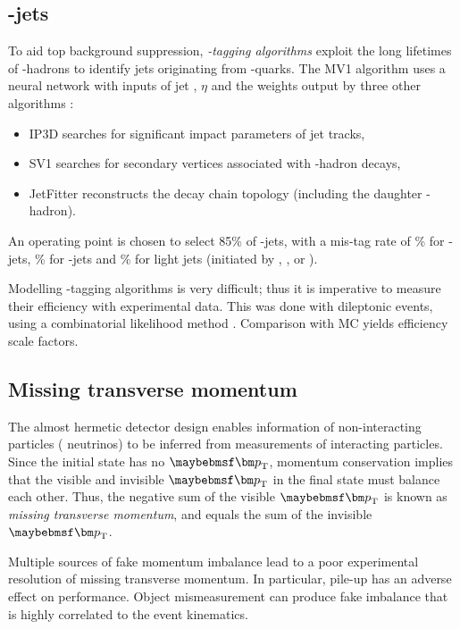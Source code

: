 \subsection{\Pbottom-jets}
\label{sec:objects:bjets}

To aid top background suppression, \textit{\Pbottom-tagging algorithms} exploit the long 
lifetimes of \Pbottom-hadrons to identify jets originating from \Pbottom-quarks. The MV1 
algorithm uses a neural network with inputs of jet \pt, $\eta$ and the weights output 
by three other algorithms \cite{Btag:algorithms}:
\begin{itemize}[noitemsep,nolistsep]
	\item IP3D searches for significant impact parameters of jet tracks,
	\item SV1 searches for secondary vertices associated with \Pbottom-hadron decays,
	\item JetFitter reconstructs the decay chain topology (including the daughter 
	\Pcharm-hadron).
\end{itemize}
An operating point is chosen to select 85\% of \Pbottom-jets, with a mis-tag rate of 
\% for \Pcharm-jets, \% for \Ptau-jets and \% for light jets
(initiated by \Pup, \Pdown, \Pstrange or \Pgluon).

Modelling \Pbottom-tagging algorithms is very difficult; thus it is imperative to measure 
their efficiency with experimental data. This was done with dileptonic \ttbar events, 
using a combinatorial likelihood method \cite{Btag:llh}. Comparison with MC yields 
efficiency scale factors.



\subsection{Missing transverse momentum}
\label{sec:objects:met}

The almost hermetic detector design enables information of non-interacting particles (\eg 
neutrinos) to be inferred from measurements of interacting particles. Since the initial 
state has no $\bvec{p}_{\text{T}}$, momentum conservation implies that the visible and 
invisible $\bvec{p}_{\text{T}}$ in the final state must balance each other. Thus, the 
negative sum of the visible $\bvec{p}_{\text{T}}$ is known as \textit{missing transverse 
momentum}, and equals the sum of the invisible $\bvec{p}_{\text{T}}$.

Multiple sources of fake momentum imbalance lead to a poor experimental resolution of 
missing transverse momentum. In particular, pile-up has an adverse effect on performance. 
Object mismeasurement can produce fake imbalance that is highly correlated to the event 
kinematics.

